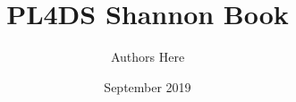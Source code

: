 \begin{titlepage}
	\author{Authors Here}
	\title{PL4DS Shannon Book}
	\date{September 2019}
\end{titlepage}
